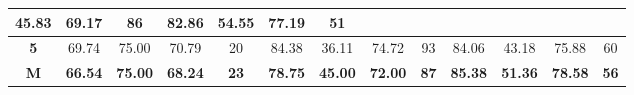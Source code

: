 \begin{table}[H]
{\begin{tabular}{c|cccc|cccc|cccc|}
			\multicolumn{1}{c|}{45.83} &
			\multicolumn{1}{c|}{69.17} &
			86 &
			\multicolumn{1}{c|}{82.86} &
			\multicolumn{1}{c|}{54.55} &
			\multicolumn{1}{c|}{77.19} &
			51 \\ \hline
			\multicolumn{1}{|c|}{\textbf{5}} &
			\multicolumn{1}{c|}{69.74} &
			\multicolumn{1}{c|}{75.00} &
			\multicolumn{1}{c|}{70.79} &
			20 &
			\multicolumn{1}{c|}{84.38} &
			\multicolumn{1}{c|}{36.11} &
			\multicolumn{1}{c|}{74.72} &
			93 &
			\multicolumn{1}{c|}{84.06} &
			\multicolumn{1}{c|}{43.18} &
			\multicolumn{1}{c|}{75.88} &
			60 \\ \hline
			\multicolumn{1}{|c|}{{\color[HTML]{00009B} \textbf{M}}} &
			\multicolumn{1}{c|}{{\color[HTML]{00009B} \textbf{66.54}}} &
			\multicolumn{1}{c|}{{\color[HTML]{00009B} \textbf{75.00}}} &
			\multicolumn{1}{c|}{{\color[HTML]{00009B} \textbf{68.24}}} &
			{\color[HTML]{00009B} \textbf{23}} &
			\multicolumn{1}{c|}{{\color[HTML]{00009B} \textbf{78.75}}} &
			\multicolumn{1}{c|}{{\color[HTML]{00009B} \textbf{45.00}}} &
			\multicolumn{1}{c|}{{\color[HTML]{00009B} \textbf{72.00}}} &
			{\color[HTML]{00009B} \textbf{87}} &
			\multicolumn{1}{c|}{{\color[HTML]{00009B} \textbf{85.38}}} &
			\multicolumn{1}{c|}{{\color[HTML]{00009B} \textbf{51.36}}} &
			\multicolumn{1}{c|}{{\color[HTML]{00009B} \textbf{78.58}}} &
			{\color[HTML]{00009B} \textbf{56}} \\ \hline
		\end{tabular}%
	}
\end{table}